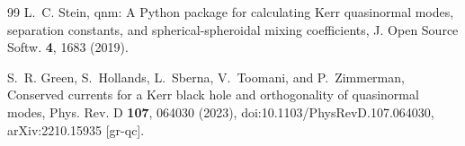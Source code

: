 \begin{thebibliography}{99}
L.~C. Stein,
qnm: A Python package for calculating Kerr quasinormal modes, separation
constants, and spherical-spheroidal mixing coefficients,
J. Open Source Softw. \textbf{4}, 1683 (2019).

S.~R. Green, S.~Hollands, L.~Sberna, V.~Toomani, and P.~Zimmerman,
Conserved currents for a Kerr black hole and orthogonality of quasinormal
modes,
Phys. Rev. D \textbf{107}, 064030 (2023),
doi:10.1103/PhysRevD.107.064030,
arXiv:2210.15935 [gr-qc].

\end{thebibliography}
